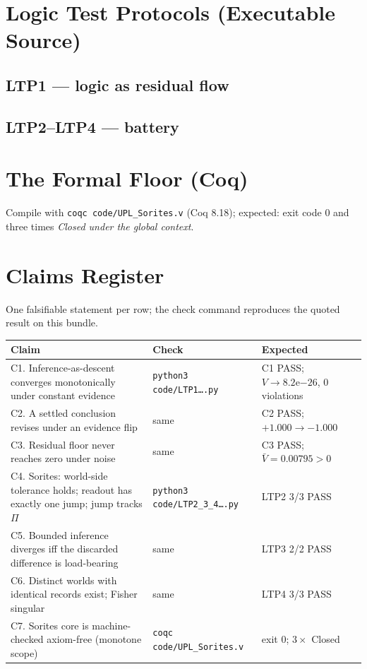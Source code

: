 \documentclass[11pt,a4paper,twoside]{book}
\theoremstyle{plain}
\theoremstyle{definition}
\theoremstyle{remark}
\begin{document}
\appendix

\chapter{Logic Test Protocols (Executable Source)}
\section{LTP1 --- logic as residual flow}

\section{LTP2--LTP4 --- battery}


\chapter{The Formal Floor (Coq)}
\noindent Compile with \texttt{coqc code/UPL\_Sorites.v} (Coq 8.18); expected:
exit code 0 and three times \emph{Closed under the global context}.


\chapter{Claims Register}
One falsifiable statement per row; the check command reproduces the quoted
result on this bundle.

\begin{center}
\footnotesize
\begin{tabular}{@{}p{}p{}p{}@{}}
\toprule
Claim & Check & Expected\\
\midrule
C1. Inference-as-descent converges monotonically under constant evidence &
\texttt{python3 code/LTP1\ldots.py} & C1 PASS; $V\!\to\!8.2\mathrm{e}{-26}$, 0 violations\\
C2. A settled conclusion revises under an evidence flip & same & C2 PASS; $+1.000\to-1.000$\\
C3. Residual floor never reaches zero under noise & same & C3 PASS; $\bar V=0.00795>0$\\
C4. Sorites: world-side tolerance holds; readout has exactly one jump; jump
tracks $\Pi$ & \texttt{python3 code/LTP2\_3\_4\ldots.py} & LTP2 3/3 PASS\\
C5. Bounded inference diverges iff the discarded difference is load-bearing &
same & LTP3 2/2 PASS\\
C6. Distinct worlds with identical records exist; Fisher singular & same &
LTP4 3/3 PASS\\
C7. Sorites core is machine-checked axiom-free (monotone scope) &
\texttt{coqc code/UPL\_Sorites.v} & exit 0; $3\times$ Closed\\
\bottomrule
\end{tabular}
\end{center}
\end{document}
